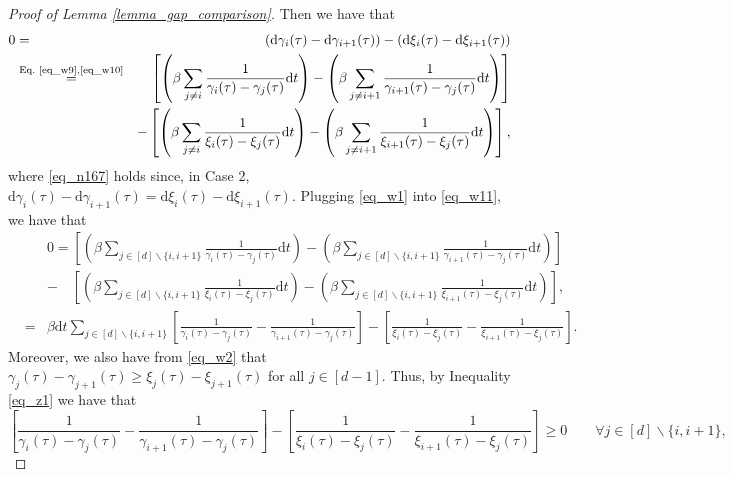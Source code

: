 \documentclass[11pt,letterpaper]{article}
\begin{document}
\begin{proof}[Proof of Lemma \ref{lemma_gap_comparison}]
%
Then we have that
%
\begin{eqnarray}
0 &=& (\mathrm{d} \gamma_i(\tau) - \mathrm{d} \gamma_{i+1} (\tau))- (\mathrm{d} \xi_i(\tau) - \mathrm{d} \xi_{i+1} (\tau))\label{eq_n167}\\
%
&\stackrel{\textrm{Eq.\ \eqref{eq_w9},\eqref{eq_w10}}}{=}&  \left[\left(\beta \sum_{j \neq i} \frac{1}{\gamma_i(\tau) - \gamma_j(\tau)} \mathrm{d}t \right)
%
-  \left(\beta \sum_{j \neq i+1} \frac{1}{\gamma_{i+1}(\tau) - \gamma_j(\tau)} \mathrm{d}t \right) \right] \nonumber\\
%
& &  - \left[\left(\beta \sum_{j \neq i} \frac{1}{\xi_i(\tau) - \xi_j(\tau)} \mathrm{d}t \right) -  \left(\beta \sum_{j \neq i+1} \frac{1}{\xi_{i+1}(\tau) - \xi_j(\tau)} \mathrm{d}t \right) \right], \label{eq_w11}
\end{eqnarray}
%
 where \eqref{eq_n167} holds since, in Case 2, $\mathrm{d} \gamma_i(\tau) - \mathrm{d}  \gamma_{i+1}(\tau) = \mathrm{d} \xi_i(\tau) - \mathrm{d}  \xi_{i+1}(\tau)$.
%
%
Plugging \eqref{eq_w1} %
into \eqref{eq_w11}, we have that
%
\begin{eqnarray}\label{eq_n10}
& & 0 
%
=  \left[\left(\beta \sum_{j \in [d] \backslash \{i,i+1\}} \frac{1}{\gamma_i(\tau) - \gamma_j(\tau)} \mathrm{d}t \right)
%
-  \left(\beta \sum_{j \in [d] \backslash \{i,i+1\}} \frac{1}{\gamma_{i+1}(\tau) - \gamma_j(\tau)} \mathrm{d}t \right) \right] \nonumber\\
%
& & - \quad \left[\left(\beta \sum_{j \in [d] \backslash \{i,i+1\}} \frac{1}{\xi_i(\tau) - \xi_j(\tau)} \mathrm{d}t \right) -  \left(\beta \sum_{j \in [d] \backslash \{i,i+1\}} \frac{1}{\xi_{i+1}(\tau) - \xi_j(\tau)} \mathrm{d}t \right) \right], \nonumber\\
%
%
&=&  \beta \mathrm{d}t \sum_{j \in [d] \backslash \{i,i+1\}} \left[\frac{1}{\gamma_i(\tau) - \gamma_j(\tau)}  -   \frac{1}{\gamma_{i+1}(\tau) - \gamma_j(\tau)} \right] - \left[ \frac{1}{\xi_i(\tau) - \xi_j(\tau)} -  \frac{1}{\xi_{i+1}(\tau) - \xi_j(\tau)} \right].  \qquad \quad
\end{eqnarray}
%
%
%
Moreover, we also have  
%
 from \eqref{eq_w2} that $ \gamma_j(\tau) - \gamma_{j+1}(\tau) \geq \xi_j(\tau) - \xi_{j+1}(\tau)$ for all $j \in [d-1]$.
%
Thus, by Inequality \eqref{eq_z1} we have that
%
\begin{equation}\label{eq_n11}
\left[\frac{1}{\gamma_i(\tau) - \gamma_j(\tau)}
%
-  \frac{1}{\gamma_{i+1}(\tau) - \gamma_j(\tau)} \right] - \left[ \frac{1}{\xi_i(\tau) - \xi_j(\tau)} -  \frac{1}{\xi_{i+1}(\tau) - \xi_j(\tau)} \right] \geq 0 \qquad \forall j \in [d] \backslash \{i,i+1\},

\end{equation}
\end{proof}
\end{document}
